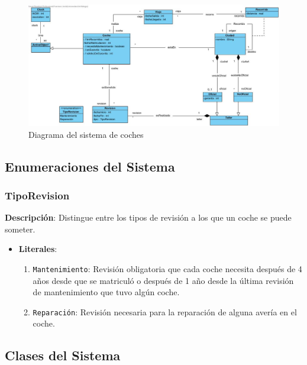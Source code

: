 \documentclass[12pt.a4paper]{article}
\begin{document}
\begin{figure}[H]
     \includegraphics[width=1\linewidth]{diagramas/VPP_A.jpg}
     \caption{Diagrama del sistema de coches}
\end{figure}
\vspace{1.0 cm}

\subsection{Enumeraciones del Sistema}

\subsubsection{TipoRevision}
\textbf{Descripción}:  
Distingue entre los tipos de revisión a los que un coche se puede someter.
\begin{itemize}
    \item \textbf{Literales}:
    \begin{enumerate}
        \item \texttt{Mantenimiento}: Revisión obligatoria que cada coche necesita después de 4 años desde que se matriculó o después de 1 año desde la última revisión de mantenimiento que tuvo algún coche.
        \item \texttt{Reparación}: Revisión necesaria para la reparación de alguna avería en el coche.
    \end{enumerate}
\end{itemize}

\subsection{Clases del Sistema}
\end{document}
